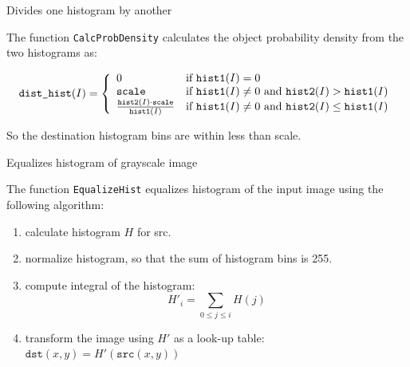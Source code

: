 \label{CalcProbDensity}

Divides one histogram by another


\begin{description}
\end{description}

The function \texttt{CalcProbDensity} calculates the object probability density from the two histograms as:

\[
\texttt{dist\_hist}(I)=
\left\{ \begin{array}{l l} 0 & \mbox{if $\texttt{hist1}(I)=0$}\\ \texttt{scale} & \mbox{if $\texttt{hist1}(I) \ne 0$ and $\texttt{hist2}(I) > \texttt{hist1}(I)$}\\ \frac{\texttt{hist2}(I) \cdot \texttt{scale}}{\texttt{hist1}(I)} & \mbox{if $\texttt{hist1}(I) \ne 0$ and $\texttt{hist2}(I) \le \texttt{hist1}(I)$}\\ \end{array} \right.
\]

So the destination histogram bins are within less than scale.

\label{EqualizeHist}

Equalizes histogram of grayscale image


\begin{description}
\end{description}

The function \texttt{EqualizeHist} equalizes histogram of the input image using the following algorithm:

\begin{enumerate}
\item calculate histogram $H$ for src.
\item normalize histogram, so that the sum of histogram bins is 255.
\item compute integral of the histogram:
\[
H'_i = \sum_{0 \le j \le i} H(j)
\]
\item transform the image using $H'$ as a look-up table: $\texttt{dst}(x,y) = H'(\texttt{src}(x,y))$
\end{enumerate}

